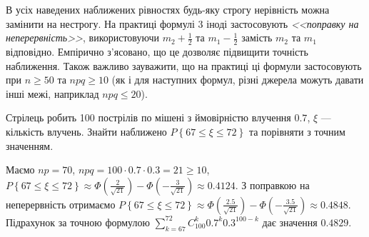 \begin{remark}
    В усіх наведених наближених рівностях будь-яку строгу нерівність можна замінити на нестрогу. На практиці формулі 3 іноді застосовують \emph{<<поправку на неперервність>>},
    використовуючи $m_2 + \frac{1}{2}$ та $m_1 - \frac{1}{2}$ замість $m_2$ та $m_1$ відповідно. Емпірично з'ясовано, що це дозволяє підвищити точність наближення.
    Також важливо зауважити, що на практиці ці формули застосовують при $n \geq 50$ та $npq \geq 10$ (як і для наступних формул, 
    різні джерела можуть давати інші межі, наприклад $npq \leq 20$).
\end{remark}
\begin{example}
    Стрілець робить 100 пострілів по мішені з ймовірністю влучення $0.7$, $\xi$ --- кількість влучень. Знайти наближено 
    $P\left\{ 67 \leq \xi \leq 72\right\}$ та порівняти з точним значенням.
    
    \noindent Маємо $np = 70$, $npq = 100 \cdot 0.7 \cdot 0.3 = 21 \geq 10$, $P\left\{ 67 \leq \xi \leq 72\right\} \approx 
    \Phi\left( \frac{2}{\sqrt{21}}\right) - \Phi\left(-\frac{3}{\sqrt{21}}\right) \approx 0.4124$.
    З поправкою на неперервність отримаємо 
    $P\left\{ 67 \leq \xi \leq 72\right\} \approx 
    \Phi\left( \frac{2.5}{\sqrt{21}}\right) - \Phi\left(-\frac{3.5}{\sqrt{21}}\right) \approx 0.4848$.
    Підрахунок за точною формулою $\sum\limits_{k=67}^{72} C_{100}^{k} 0.7^k 0.3^{100-k}$ дає значення $0.4829$.
\end{example}

